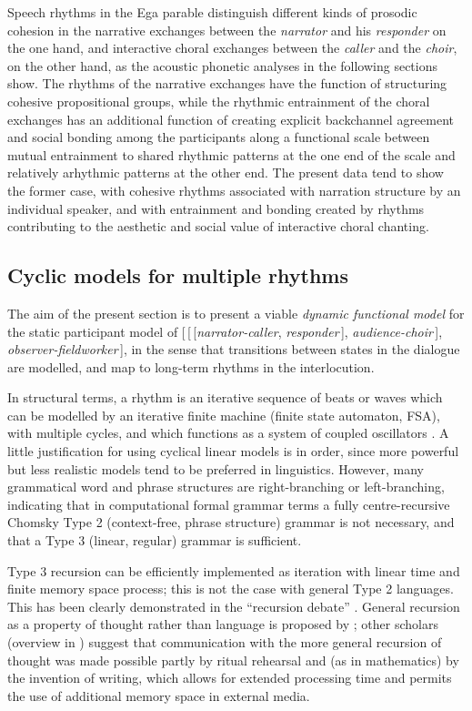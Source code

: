 \documentclass[output=paper,colorlinks,citecolor=brown]{langscibook}
\begin{document}
Speech rhythms in the Ega parable distinguish different kinds of prosodic cohesion in the narrative exchanges between the \textit{narrator} and his \textit{responder} on the one hand, and interactive choral exchanges between the \textit{caller} and the \textit{choir}, on the other hand, as the acoustic phonetic analyses in the following sections show. The rhythms of the narrative exchanges have the function of structuring cohesive propositional groups, while the rhythmic entrainment of the choral exchanges has an additional function of creating explicit backchannel agreement and social bonding among the participants along a functional scale between mutual entrainment to shared rhythmic patterns at the one end of the scale and relatively arhythmic patterns at the other end. The present data tend to show the former case, with cohesive rhythms associated with narration structure by an individual speaker, and with entrainment and bonding created by rhythms contributing to the aesthetic and social value of interactive choral chanting.

\subsection{Cyclic models for multiple rhythms}

The aim of the present section is to present a viable \textit{dynamic functional model} for the static participant model of [\,[\,[\textit{narrator-caller}, \textit{responder}\,], \textit{audience-choir}\,], \textit{observer-fieldworker}\,], in the sense that transitions between states in the dialogue are modelled, and map to long-term rhythms in the interlocution.

In structural terms, a rhythm is an iterative sequence of beats or waves which can be modelled by an iterative finite machine (finite state automaton, FSA), with multiple cycles, and which functions as a system of coupled oscillators \citep{cumminsport1998, odellnieminen1999, barbosa2002}. A little justification for using cyclical linear models is in order, since more powerful but less realistic models tend to be preferred in linguistics. However, many grammatical word and phrase structures are right-branching or left-branching, indicating that in computational formal grammar terms a fully centre-recursive Chomsky Type 2 (context-free, phrase structure) grammar is not necessary, and that a Type 3 (linear, regular) grammar is sufficient.

Type 3 recursion can be efficiently implemented as iteration with linear time and finite memory space process; this is not the case with general Type 2 languages. This has been clearly demonstrated in the “recursion debate” \citep{karlsson2010}. General recursion as a property of thought rather than language is proposed by \citet{everett2016}; other scholars (overview in ) suggest that communication with the more general recursion of thought was made possible partly by ritual rehearsal and (as in mathematics) by the invention of writing, which allows for extended processing time and permits the use of additional memory space in external media.
\end{document}
